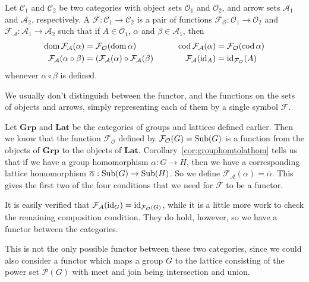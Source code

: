 \begin{definition}
  Let $\mathcal{C}_{1}$ and $\mathcal{C}_{2}$ be two categories with
  object sets $\mathcal{O}_{1}$ and $\mathcal{O}_{2}$, and arrow sets
  $\mathcal{A}_{1}$ and $\mathcal{A}_{2}$, respectively.  A 
   $\mathcal{F} : \mathcal{C}_{1} \to 
  \mathcal{C}_{2}$ is a pair of functions $\mathcal{F_{O}} : 
  \mathcal{O}_{1} \to \mathcal{O}_{2}$ and $\mathcal{F_{A}} : 
  \mathcal{A}_{1} \to \mathcal{A}_{2}$ such that if $A \in 
  \mathcal{O_{1}}$, $\alpha$ and $\beta \in \mathcal{A_{1}}$, then
  \begin{alignat*}{2}
    \operatorname{dom} \mathcal{F_{A}}(\alpha) &= \mathcal{F_{O}}(\operatorname{dom} \alpha) & \operatorname{cod}
    \mathcal{F_{A}}(\alpha) &= \mathcal{F_{O}}(\operatorname{cod} \alpha)\\
    \mathcal{F_{A}}(\alpha \circ \beta) &= (\mathcal{F_{A}}(\alpha)
    \circ \mathcal{F_{A}}(\beta) \qquad & \mathcal{F_{A}}(\text{id}_{A}) &=
    \text{id}_{\mathcal{F_{O}}}(A)
  \end{alignat*}
  whenever $\alpha \circ \beta$ is defined.
\end{definition}

We usually don't distinguish between the functor, and the functions 
on the sets of objects and arrows, simply representing each of them 
by a single symbol $\mathcal{F}$.

\begin{example}\label{eg:funtorgrplat}
  Let $\mathbf{Grp}$ and $\mathbf{Lat}$ be the categories of groups
  and lattices defined earlier.  Then we know that the function
  $\mathcal{F_{O}}$ defined by $\mathcal{F_{O}}(G) = \operatorname{Sub}(G)$ is a
  function from the objects of $\mathbf{Grp}$ to the objects of
  $\mathbf{Lat}$.  Corollary~\ref{cor:grouphomtolathom} tells us that
  if we have a group homomorphism $\alpha: G \to H$, then we have a
  corresponding lattice homomorphism $\overline{\alpha} : \operatorname{Sub}(G) \to
  \operatorname{Sub}(H)$.  So we define $\mathcal{F_{A}}(\alpha) =
  \overline{\alpha}$.  This gives the first two of the four conditions
  that we need for $\mathcal{F}$ to be a functor.
  
  It is easily verified that $\mathcal{F_{A}}(\text{id}_{G}) =
  \text{id}_{\mathcal{F_{O}}(G)}$, while it is a little more work to check
  the remaining composition condition.  They do hold, however, so we 
  have a functor between the categories.
  
  This is not the only possible functor between these two categories,
  since we could also consider a functor which maps a group $G$ to the
  lattice consisting of the power set $\mathcal{P}(G)$ with meet and
  join being intersection and union.
\end{example}

